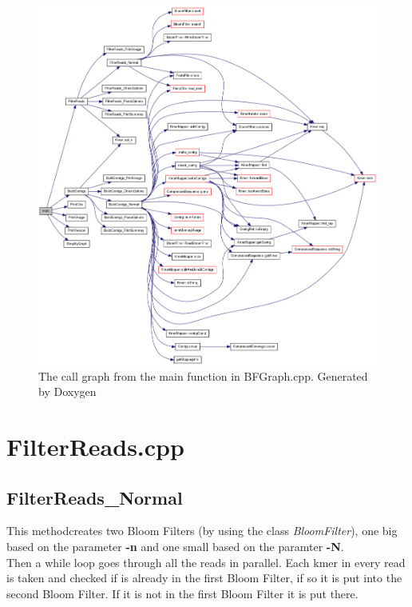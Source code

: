 \documentclass[a4paper]{report}
\renewcommand{\b}[1]{\textbf{#1}}  %
\renewcommand{\i}[1]{\textit{#1}}  %
\begin{document}
\begin{figure}
\hspace*{-50pt}\includegraphics[scale=0.4]{img/Call_graph.png}
\caption{The call graph from the main function in BFGraph.cpp. Generated by Doxygen\cite{doxygen}}
\label{callgraph}
\end{figure}

\section{FilterReads.cpp}
\subsection{FilterReads\_Normal}
This methodcreates two Bloom Filters (by using the class \i{BloomFilter}), one big based on the parameter 
\b{-n} and one small based on the paramter \b{-N}. \\[4pt]

Then a while loop goes through all the reads in parallel. Each kmer in every read is taken and checked if is already in the first Bloom Filter,
if so it is put into the second Bloom Filter. If it is not in the first Bloom Filter it is put there. \\[4pt]
\end{document}
